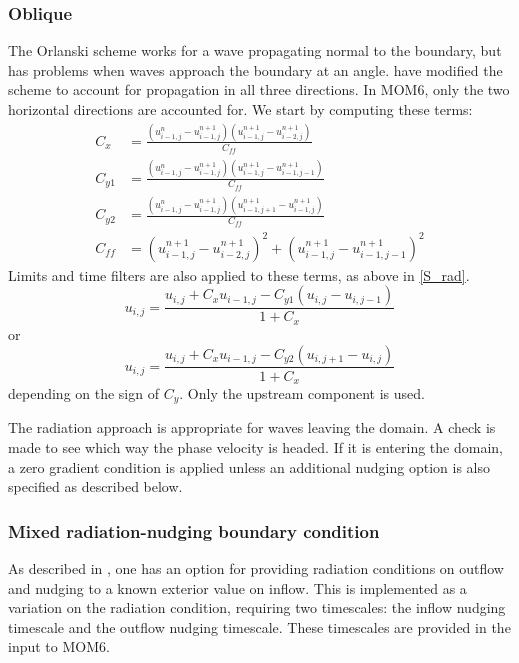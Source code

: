 \documentclass[11pt]{article}
\begin{document}
\subsubsection{Oblique}
The Orlanski scheme works for a wave propagating normal to the boundary, but
has problems when waves approach the boundary at an angle.
\citet{Raymond84} have modified the scheme to account for
propagation in all three directions. In MOM6, only the two horizontal
directions are accounted for. We start by computing these terms:
\begin{align}
  C_x &= \frac{(u^n_{i-1,j} - u^{n+1}_{i-1,j})(u^{n+1}_{i-1,j} - u^{n+1}_{i-2,j})}{C_{ff}} \\
  C_{y1} &= \frac{(u^n_{i-1,j} - u^{n+1}_{i-1,j})(u^{n+1}_{i-1,j} - u^{n+1}_{i-1,j-1})}{C_{ff}} \\
  C_{y2} &= \frac{(u^n_{i-1,j} - u^{n+1}_{i-1,j})(u^{n+1}_{i-1,j+1} - u^{n+1}_{i-1,j})}{C_{ff}} \\
  C_{ff} &= (u^{n+1}_{i-1,j} - u^{n+1}_{i-2,j})^2 + (u^{n+1}_{i-1,j} - u^{n+1}_{i-1,j-1})^2 
\end{align}
Limits and time filters are also applied to these terms, as above in \ref{S_rad}.
\begin{equation}
   u_{i,j} = \frac{u_{i,j} + C_x u_{i-1,j} - C_{y1} (u_{i,j} - u_{i,j-1})}{1 + C_x}
\label{eqrka}
\end{equation}
or
\begin{equation}
   u_{i,j} = \frac{u_{i,j} + C_x u_{i-1,j} - C_{y2} (u_{i,j+1} - u_{i,j})}{1 + C_x}
\label{eqrkb}
\end{equation}
depending on the sign of $C_y$. Only the upstream component is used.

The radiation approach is appropriate for waves leaving the domain. A
check is made to see which way the phase velocity is headed. If it
is entering the domain, a zero gradient condition is applied unless
an additional nudging option is also specified as described below.

\subsubsection{Mixed radiation-nudging boundary condition}
As described in \citep{Marchesiello2001}, one has an option for
providing radiation conditions on outflow and nudging to a known
exterior value on inflow. This is implemented as a variation on the
radiation condition, requiring two timescales: the inflow nudging
timescale and the outflow nudging timescale. These timescales are
provided in the input to MOM6.
\end{document}
